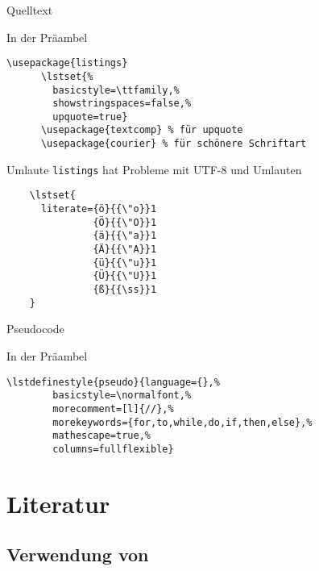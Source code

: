 \begin{Frame}[fragile]{Quelltext}
  \begin{Block}{In der Präambel}
    \begin{lstlisting}[style=block,gobble=6]
      \usepackage{listings}
      \lstset{%
        basicstyle=\ttfamily,%
        showstringspaces=false,%
        upquote=true}
      \usepackage{textcomp} % für upquote
      \usepackage{courier} % für schönere Schriftart
    \end{lstlisting}
  \end{Block}

  
  \lstset{style=block}
  
\end{Frame}

\begin{Frame}[fragile]{Umlaute}
  \texttt{listings} hat Probleme mit UTF-8 und Umlauten
  \begin{lstlisting}[gobble=4]
    % german umlauts
    \lstset{
      literate={ö}{{\"o}}1
               {Ö}{{\"O}}1
               {ä}{{\"a}}1
               {Ä}{{\"A}}1
               {ü}{{\"u}}1
               {Ü}{{\"U}}1
               {ß}{{\ss}}1
    }
  \end{lstlisting}
\end{Frame}

\begin{Frame}[fragile]{Pseudocode}
  \begin{Block}{In der Präambel}
    \begin{lstlisting}[style=block,gobble=6]
      \lstdefinestyle{pseudo}{language={},%
        basicstyle=\normalfont,%
        morecomment=[l]{//},%
        morekeywords={for,to,while,do,if,then,else},%
        mathescape=true,%
        columns=fullflexible}
    \end{lstlisting}
  \end{Block}

  
  \lstset{style=block}
  
\end{Frame}

\section{Literatur}

\subsection{Verwendung von \BibTeX}

